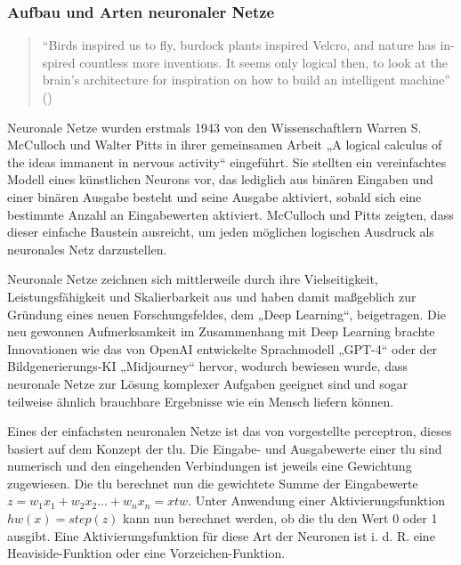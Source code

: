 \subsubsection{Aufbau und Arten neuronaler Netze}

\begin{quote}
  "`Birds inspired us to fly, burdock plants inspired Velcro, and nature has in- spired countless more inventions. It seems only logical then, to look at the brain’s architecture for inspiration on how to build an intelligent machine"' (\cite[S. 279]{Geron2019})
\end{quote}

Neuronale Netze wurden erstmals 1943 von den Wissenschaftlern Warren S. McCulloch und Walter Pitts in ihrer gemeinsamen Arbeit „A logical calculus of the ideas immanent in nervous activity“ \cite{McCulloch1943} eingeführt. Sie stellten ein vereinfachtes Modell eines künstlichen Neurons vor, das lediglich aus binären Eingaben und einer binären Ausgabe besteht und seine Ausgabe aktiviert, sobald sich eine bestimmte Anzahl an Eingabewerten aktiviert. McCulloch und Pitts zeigten, dass dieser einfache Baustein ausreicht, um jeden möglichen logischen Ausdruck als neuronales Netz darzustellen.

Neuronale Netze zeichnen sich mittlerweile durch ihre Vielseitigkeit, Leistungsfähigkeit und Skalierbarkeit aus und haben damit maßgeblich zur Gründung eines neuen Forschungsfeldes, dem „Deep Learning“, beigetragen. \cite{Geron2019} Die neu gewonnen Aufmerksamkeit im Zusammenhang mit Deep Learning brachte Innovationen wie das von OpenAI entwickelte Sprachmodell „GPT-4“ oder der Bildgenerierungs-KI „Midjourney“ hervor, wodurch bewiesen wurde, dass neuronale Netze zur Lösung komplexer Aufgaben geeignet sind und sogar teilweise ähnlich brauchbare Ergebnisse wie ein Mensch liefern können. \cite{OpenAI2024}

Eines der einfachsten neuronalen Netze ist das von \cite{Rosenblatt1958} vorgestellte \gls{perceptron}, dieses basiert auf dem Konzept der \gls{tlu}. Die Eingabe- und Ausgabewerte einer \gls{tlu} sind numerisch und den eingehenden Verbindungen ist jeweils eine Gewichtung zugewiesen. Die \gls{tlu} berechnet nun die gewichtete Summe der Eingabewerte \(z=w_1x_1+w_2x_2 ... +w_nx_n=xtw\). Unter Anwendung einer Aktivierungsfunktion \(hw(x)=step(z)\) kann nun berechnet werden, ob die \gls{tlu} den Wert 0 oder 1 ausgibt. Eine Aktivierungsfunktion für diese Art der Neuronen ist i. d. R. eine Heaviside-Funktion oder eine Vorzeichen-Funktion. \cite[vgl. S. 284 ff.]{Geron2019}

